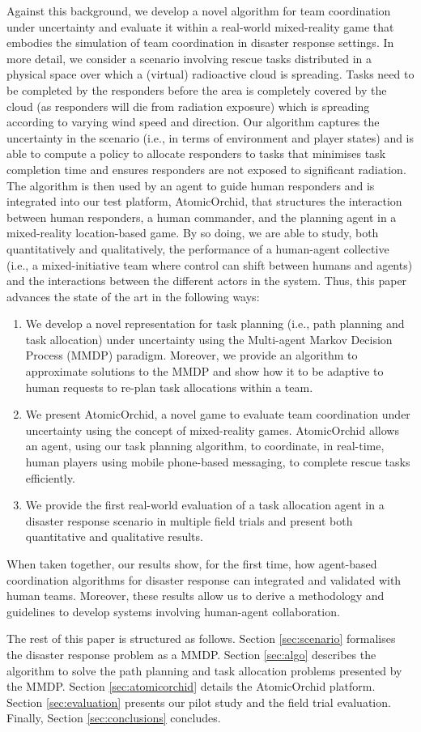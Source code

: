 Against this background, we develop a novel algorithm for team coordination under uncertainty and evaluate it within a real-world mixed-reality game that embodies the simulation of team coordination in disaster response settings. In more detail, we consider a scenario involving rescue tasks distributed in a physical space over which a (virtual) radioactive cloud is spreading. Tasks need to be completed by the responders before the area is completely covered by the cloud (as responders will die from radiation exposure) which is spreading according to varying wind speed and direction. Our algorithm captures the uncertainty in the scenario (i.e., in terms of environment and player states) and  is able to compute a policy to allocate responders to tasks that minimises task completion time and ensures responders are not exposed to significant radiation. The algorithm is then used by an agent to guide human responders and is  integrated  into our test platform, AtomicOrchid, that structures the interaction between human responders, a human commander, and the planning agent in a mixed-reality location-based game. By so doing, we are able to study, both quantitatively and qualitatively, the performance of a human-agent collective (i.e., a mixed-initiative team where control can shift between humans and agents)  and the interactions between the different actors in the system. Thus, this paper advances the state of the art in the following ways:
\begin{enumerate}
\item We develop a novel representation for task planning (i.e., path planning and task allocation) under uncertainty using the Multi-agent Markov Decision Process (MMDP) paradigm. Moreover, we provide an algorithm to approximate solutions to the MMDP and show how it to be adaptive to human requests to re-plan task allocations within a team.
\item We present AtomicOrchid, a novel game to evaluate team coordination under uncertainty using the concept of mixed-reality games. AtomicOrchid allows an agent, using our task planning algorithm, to coordinate, in real-time, human players using mobile phone-based messaging, to complete rescue tasks efficiently.
\item We provide the first real-world evaluation of a task allocation agent in a disaster response scenario in multiple field trials and present both quantitative and qualitative results. 
\end{enumerate}
When taken together, our results show, for the first time, how agent-based coordination algorithms for disaster response can integrated and validated with human teams. Moreover, these results allow us to derive a methodology and guidelines to develop systems involving  human-agent collaboration. 

The rest of this paper is structured as follows. Section \ref{sec:scenario} formalises the disaster response problem as a MMDP. Section \ref{sec:algo}  describes the algorithm to solve the path planning and task allocation problems presented by the MMDP. Section \ref{sec:atomicorchid}  details the AtomicOrchid platform. Section \ref{sec:evaluation} presents our pilot study and the  field trial evaluation.  Finally, Section \ref{sec:conclusions} concludes.